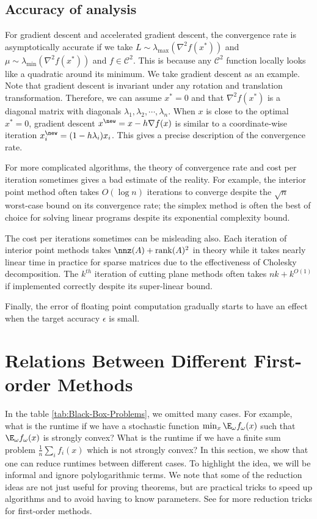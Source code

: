\subsection{Accuracy of analysis}

For gradient descent and accelerated gradient descent, the convergence
rate is asymptotically accurate if we take $L\sim\lambda_{\max}(\nabla^{2}f(x^{*}))$
and $\mu\sim\lambda_{\min}(\nabla^{2}f(x^{*}))$ and $f\in\mathcal{C}^{2}$.
This is because any $\mathcal{C}^{2}$ function locally looks like
a quadratic around its minimum. We take gradient descent as an example.
Note that gradient descent is invariant under any rotation and translation
transformation. Therefore, we can assume $x^{*}=0$ and that $\nabla^{2}f(x^{*})$
is a diagonal matrix with diagonals $\lambda_{1},\lambda_{2},\cdots,\lambda_{n}$.
When $x$ is close to the optimal $x^{*}=0$, gradient descent $x^{\new}=x-h\nabla f(x)$
is similar to a coordinate-wise iteration $x_{i}^{\new}=(1-h\lambda_{i})x_{i}$.
This gives a precise description of the convergence rate.

For more complicated algorithms, the theory of convergence rate and
cost per iteration sometimes gives a bad estimate of the reality.
For example, the interior point method often takes $O(\log n)$ iterations
to converge despite the $\sqrt{n}$ worst-case bound on its convergence
rate; the simplex method is often the best of choice for solving linear
programs despite its exponential complexity bound.

The cost per iterations sometimes can be misleading also. Each iteration
of interior point methods takes $\nnz(A)+\mathrm{rank}(A)^{2}$ in
theory while it takes nearly linear time in practice for sparse matrices
due to the effectiveness of Cholesky decomposition. The $k^{th}$
iteration of cutting plane methods often takes $nk+k^{O(1)}$ if implemented
correctly despite its super-linear bound.

Finally, the error of floating point computation gradually starts
to have an effect when the target accuracy $\epsilon$ is small.

\section{Relations Between Different First-order Methods}

In the table \ref{tab:Black-Box-Problems}, we omitted many cases.
For example, what is the runtime if we have a stochastic function
$\min_{x}\E_{\omega}f_{\omega}(x)$ such that $\E_{\omega}f_{\omega}(x)$
is strongly convex? What is the runtime if we have a finite sum problem
$\frac{1}{n}\sum_{i}f_{i}(x)$ which is not strongly convex? In this
section, we show that one can reduce runtimes between different cases.
To highlight the idea, we will be informal and ignore polylogarithmic
terms. We note that some of the reduction ideas are not just useful
for proving theorems, but are practical tricks to speed up algorithms
and to avoid having to know parameters. See \cite{lin2015universal,frostig2015regularizing,o2015adaptive,allen2016optimal}
for more reduction tricks for first-order methods.


